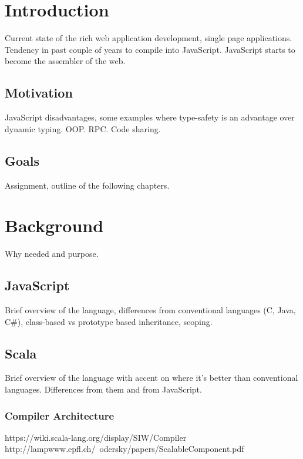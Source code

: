 \documentclass[12pt,a4paper]{report}
\begin{document}
\chapter{Introduction}

Current state of the rich web application development, single page applications. Tendency in past couple of years to compile into JavaScript. JavaScript starts to become the assembler of the web.

\section{Motivation}

JavaScript disadvantages, some examples where type-safety is an advantage over dynamic typing. OOP. RPC. Code sharing.

\section{Goals}

Assignment, outline of the following chapters.


\chapter{Background}

Why needed and purpose. 

\section{JavaScript}

Brief overview of the language, differences from conventional languages (C, Java, C\#), class-based vs prototype based inheritance, scoping.

\section{Scala}

Brief overview of the language with accent on where it's better than conventional languages. Differences from them and from JavaScript.

\subsection{Compiler Architecture}

https://wiki.scala-lang.org/display/SIW/Compiler
http://lampwww.epfl.ch/~odersky/papers/ScalableComponent.pdf
\end{document}
